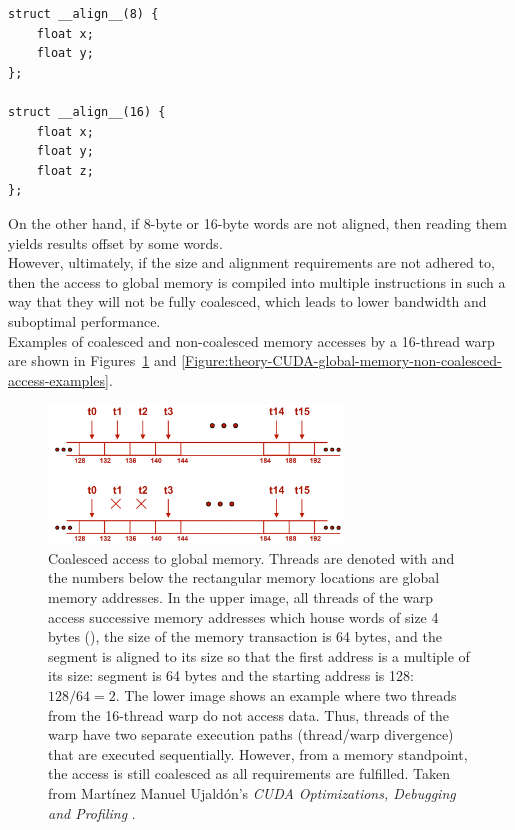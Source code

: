 \begin{lstlisting}[caption={Declaration of to-be-aligned 8- and 16-byte structures. The lower example is aligned to 16 bytes as 12-byte alignment (3 4-byte floats) is not coalesced, therefore, 4 bytes are used for padding. Taken from Nvidia's \emph{CUDA C++ Programming Guide} \cite{NVIDIAMay2022}.},label={Listing:theory-CUDA-aligned-structure-declaration}]
struct __align__(8) {
	float x;
	float y;
};

struct __align__(16) {
	float x;
	float y;
	float z;
};
\end{lstlisting}

On the other hand, if 8-byte or 16-byte words are not aligned, then reading them yields results offset by some words. \\
However, ultimately, if the size and alignment requirements are not adhered to, then the access to global memory is compiled into multiple instructions in such a way that they will not be fully coalesced, which leads to lower bandwidth and suboptimal performance. \\
Examples of coalesced and non-coalesced memory accesses by a 16-thread warp are shown in Figures~\ref{Figure:theory-CUDA-global-memory-coalesced-access} and \ref{Figure:theory-CUDA-global-memory-non-coalesced-access-examples}.

\begin{figure}[ht!]
	\centering
	\includegraphics[width=0.7\textwidth, keepaspectratio]{images/ch1/CUDA_global_memory_coalesced_access.png}
	\caption{Coalesced access to global memory. Threads are denoted with  and the numbers below the rectangular memory locations are global memory addresses. In the upper image, all threads of the warp access successive memory addresses which house words of size 4 bytes (), the size of the memory transaction is 64 bytes, and the segment is aligned to its size so that the first address is a multiple of its size: segment is 64 bytes and the starting address is 128: $ 128/64 = 2 $. The lower image shows an example where two threads from the 16-thread warp do not access data. Thus, threads of the warp have two separate execution paths (thread/warp divergence) that are executed sequentially. However, from a memory standpoint, the access is still coalesced as all requirements are fulfilled. Taken from Martínez Manuel Ujaldón's \emph{CUDA Optimizations, Debugging and Profiling} \cite{xUOrKLpxlGjvTonr}.}
	\label{Figure:theory-CUDA-global-memory-coalesced-access}
\end{figure}

